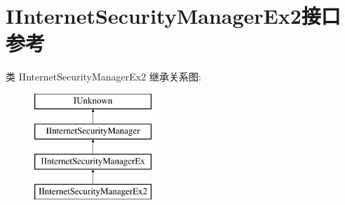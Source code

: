\hypertarget{interface_i_internet_security_manager_ex2}{}\section{I\+Internet\+Security\+Manager\+Ex2接口 参考}
\label{interface_i_internet_security_manager_ex2}
类 I\+Internet\+Security\+Manager\+Ex2 继承关系图\+:\begin{figure}[H]
\begin{center}
\leavevmode
\includegraphics[height=4.000000cm]{interface_i_internet_security_manager_ex2}
\end{center}
\end{figure}
